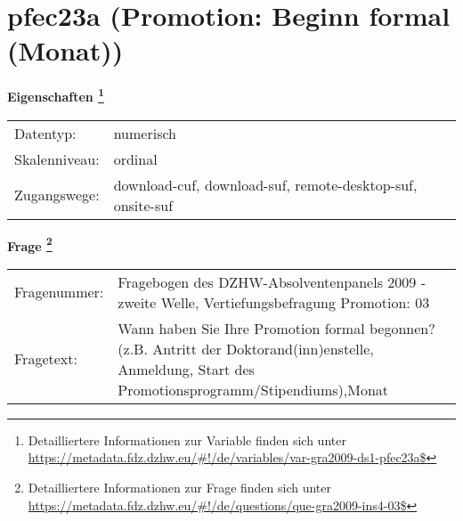 
    \setcounter{footnote}{0}

    \vspace*{-1.8cm}
	\section{pfec23a (Promotion: Beginn formal (Monat))}
	\label{section:pfec23a}



    \vspace*{0.5cm}
    \noindent\textbf{Eigenschaften
	\footnote{Detailliertere Informationen zur Variable finden sich unter
		\url{https://metadata.fdz.dzhw.eu/\#!/de/variables/var-gra2009-ds1-pfec23a$}}}\\
	\begin{tabularx}{\hsize}{@{}lX}
	Datentyp: & numerisch \\
	Skalenniveau: & ordinal \\
	Zugangswege: &
	  download-cuf, 
	  download-suf, 
	  remote-desktop-suf, 
	  onsite-suf
 \\
    \end{tabularx}



				\vspace*{0.5cm}
                \noindent\textbf{Frage
	                \footnote{Detailliertere Informationen zur Frage finden sich unter
		              \url{https://metadata.fdz.dzhw.eu/\#!/de/questions/que-gra2009-ins4-03$}}}\\
				\begin{tabularx}{\hsize}{@{}lX}
					Fragenummer: &
					  Fragebogen des DZHW-Absolventenpanels 2009 - zweite Welle, Vertiefungsbefragung Promotion:
					  03
 \\
					Fragetext: & Wann haben Sie Ihre Promotion formal begonnen? (z.B. Antritt der Doktorand(inn)enstelle, Anmeldung, Start des Promotionsprogramm/Stipendiums),Monat \\
				\end{tabularx}





